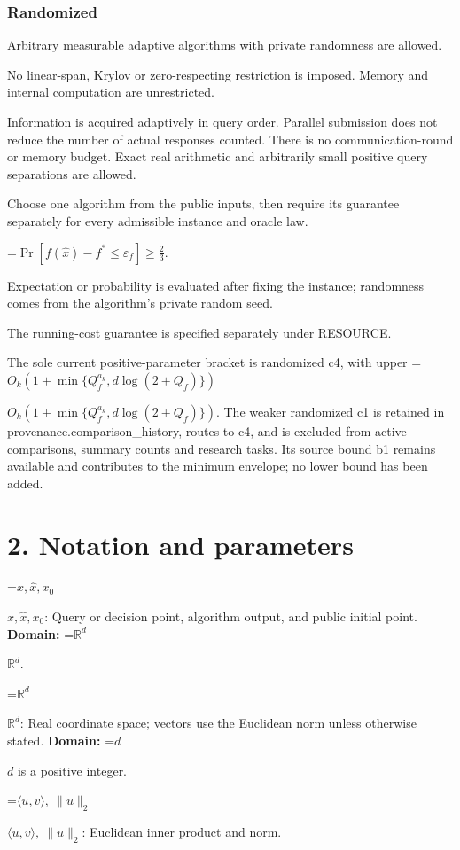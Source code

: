 \documentclass[10pt,a4paper]{article}
\newcommand{\AtlasMath}[1]{\par\begingroup\centering\setbox0=\hbox{$\displaystyle #1$}\ifdim\wd0>1.4\linewidth\typeout{ATLAS WIDE FORMULA: \the\wd0}\fi\ifdim\wd0>\linewidth\resizebox{\linewidth}{!}{\box0}\else\box0\fi\par\endgroup}
\newcommand{\AtlasInlineMath}[1]{\begingroup\setbox0=\hbox{$#1$}\ifdim\wd0>.4\linewidth\endgroup\AtlasMath{#1}\else\endgroup$#1$\fi}
\begin{document}
\subsubsection{Randomized}
Arbitrary measurable adaptive algorithms with private randomness are allowed.

No linear-span, Krylov or zero-respecting restriction is imposed. Memory and internal computation are unrestricted.

Information is acquired adaptively in query order. Parallel submission does not reduce the number of actual responses counted. There is no communication-round or memory budget. Exact real arithmetic and arbitrarily small positive query separations are allowed.

Choose one algorithm from the public inputs, then require its guarantee separately for every admissible instance and oracle law.




\AtlasMath{\Pr\!\left[f(\widehat{x})-f^*\le \varepsilon_f\right]\ge\frac23.}




Expectation or probability is evaluated after fixing the instance; randomness comes from the algorithm's private random seed.

The running-cost guarantee is specified separately under RESOURCE.

The sole current positive-parameter bracket is randomized c4, with upper \AtlasInlineMath{O_k(1+\min\{Q_f^{a_k},d\log(2+Q_f)\})}. The weaker randomized c1 is retained in provenance.comparison\_history, routes to c4, and is excluded from active comparisons, summary counts and research tasks. Its source bound b1 remains available and contributes to the minimum envelope; no lower bound has been added.

\section{2. Notation and parameters}
\AtlasInlineMath{x,\widehat{x},x_0}: Query or decision point, algorithm output, and public initial point. \textbf{Domain:} \AtlasInlineMath{\mathbb{R}^d}.

\AtlasInlineMath{\mathbb{R}^d}: Real coordinate space; vectors use the Euclidean norm unless otherwise stated. \textbf{Domain:} \AtlasInlineMath{d} is a positive integer.

\AtlasInlineMath{\langle u,v\rangle,\ \|u\|_2}: Euclidean inner product and norm.
\end{document}
